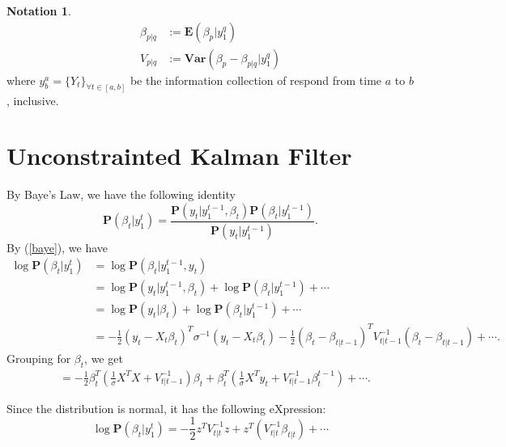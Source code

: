 \documentclass{article}
\theoremstyle{plain}
\theoremstyle{definition}
\newtheorem{notation}[thm]{Notation}\small
\theoremstyle{remark}
\newcommand{\E}{\mathbf{E}}
\newcommand{\Var}{\mathbf{Var}}
\newcommand{\PP}{\mathbf{P}}
\begin{document}
\begin{notation}
\begin{equation*}
\begin{split}
\beta_{p|q} &:= \E(\beta_p |y^q_1 )\\
V_{p|q} &:= \Var(\beta_p - \beta_{p|q} |y^q_1  ) 
\end{split}
\end{equation*}
where $y^a_b = \{Y_t\}_{\forall t \in [a,b]}$ be the information collection of respond from time $a$ to $b$, inclusive.
\end{notation}

\section{Unconstrainted Kalman Filter}
By Baye's Law, we have the following identity
\begin{equation}
\PP(\beta_t | y_1^t) = \frac{ \PP(y_t |  y^{t-1}_1, \beta_t) \PP ( \beta_t | y ^{t-1}_1)}{\PP(y_t |  y_1^{t-1})}.
\label{baye}
\end{equation}
By (\ref{baye}), we have 
\begin{equation}
\begin{split}
\log \PP(\beta_t |  y^t_1) &= \log \PP(\beta_t |  y^{t-1}_1, y_t)\\
&= \log \PP(y_t |  y^{t-1}_1, \beta_t) + \log \PP ( \beta_t | y ^{t-1}_1) + \cdots\\
&= \log \PP(y_t |  \beta_t) + \log \PP ( \beta_t | y ^{t-1}_1) + \cdots\\
&= - \frac12 (y_t - X_t \beta_t )^T \sigma ^{-1}  (y_t - X_t \beta_t ) - \frac12 (\beta_t - \beta_{t|t-1})^T V_{t|t-1}^{-1} (\beta_t - \beta_{t|t-1})+ \cdots.
\end{split}
\end{equation}
Grouping for $\beta_t$, we get
\begin{equation}
\begin{split}
&= - \frac12 \beta^T_t (\frac1\sigma X^T X + V_{t|t-1}^{-1}) \beta_t + \beta^T_t ( \frac1\sigma X^T y_t + V_{t|t-1}^{-1} \beta_t^{t-1}) + \cdots.
\end{split}
\end{equation}

Since the distribution is normal, it has the following eXpression:
\begin{equation}
\log \PP(\beta_t |  y^t_1) = -\frac12 z^T V_{t|t}^{-1} z + z^T ( V_{t|t}^{-1} \beta_{t|t}) + \cdots
\end{equation}
\end{document}
